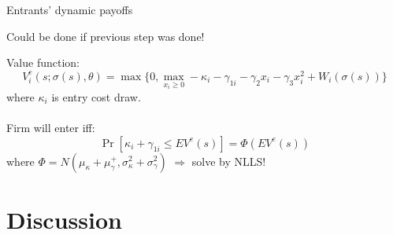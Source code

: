 \documentclass[12pt]{beamer}
\newcommand{\Prob}[1]{\operatorname{Pr}\left[#1\right]}
\begin{document}
\begin{frame}{Entrants' dynamic payoffs}
\begin{center}
Could be done if previous step was done!
\end{center}
Value function:
$$V_i^e(s; \sigma(s), \theta) = \max\{0, \max_{x_i\geq 0} -\kappa_i - \gamma_{1i} - \gamma_2x_i - \gamma_3x_i^2 + W_i(\sigma(s))\} $$
where $\kappa_i$ is entry cost draw.\\~\\

Firm will enter iff:
$$\Prob{\kappa_i + \gamma_{1i} \leq EV^e(s)} = \Phi\left( EV^e(s)\right) $$ where $\Phi = N(\mu_\kappa + \mu_\gamma^+, \sigma_\kappa^2 + \sigma_\gamma^2)$ $\Rightarrow$ solve by NLLS!
\end{frame}


\section{Discussion}
\end{document}
